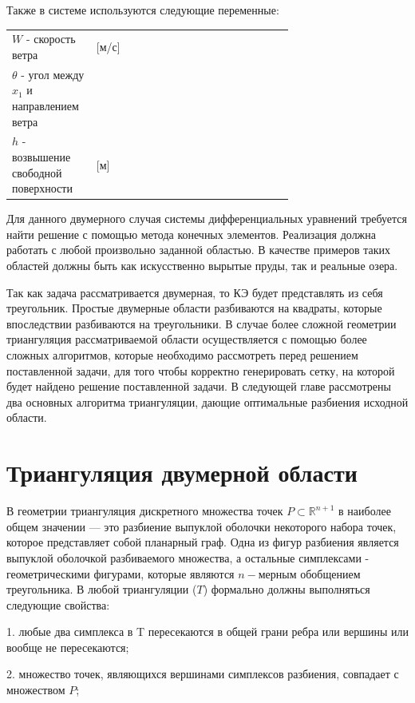 \documentclass[14pt]{extreport}
\begin{document}
Также в системе используются следующие переменные:

\begin{threeparttable}
\begin{longtable}[H]{lp{0.7\linewidth}}
{$W$} - скорость ветра & [м/с] \\
{$\theta$} - угол между $x_1$ и направлением ветра & \\
{$h$} - возвышение свободной поверхности & [м]
\end{longtable} 
\end{threeparttable}


Для данного двумерного случая системы дифференциальных уравнений требуется найти решение с помощью метода конечных элементов. Реализация должна работать с любой произвольно заданной областью. В качестве примеров таких областей должны быть как искусственно вырытые пруды, так и реальные озера. 

Так как задача рассматривается двумерная, то КЭ будет представлять из себя треугольник. Простые двумерные области разбиваются на квадраты, которые впоследствии разбиваются на треугольники. В случае более сложной геометрии триангуляция рассматриваемой области осуществляется с помощью более сложных алгоритмов, которые необходимо рассмотреть перед решением поставленной задачи, для того чтобы корректно генерировать сетку, на которой будет найдено решение поставленной задачи. В следующей главе рассмотрены два основных алгоритма триангуляции, дающие оптимальные разбиения исходной области.

\chapter{Триангуляция двумерной области}

В геометрии триангуляция дискретного множества точек $P\subset {\mathbb  {R}}^{{n+1}}$ в наиболее общем значении — это разбиение  выпуклой оболочки некоторого набора точек, которое представляет собой планарный граф\cite{bib:triangle:delone}. Одна из фигур разбиения является выпуклой оболочкой разбиваемого множества, а остальные симплексами -  геометрическими фигурами, которые являются $n-$мерным обобщением треугольника. В любой триангуляции ($T$) формально должны выполняться следующие свойства:

	1. любые два симплекса в T пересекаются в общей грани ребра или вершины или вообще не пересекаются;

	2. множество точек, являющихся вершинами симплексов разбиения, совпадает с множеством $P$;
	
\end{document}
